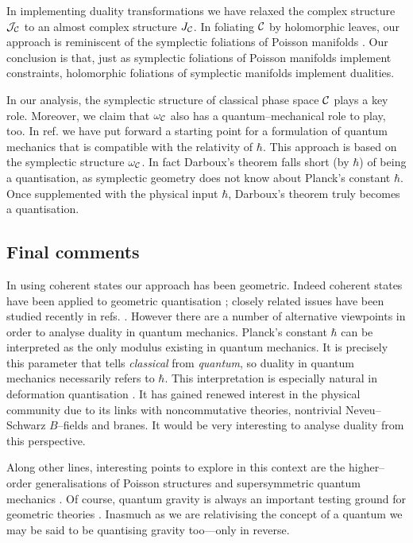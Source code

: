 \documentclass[a4paper,a4paper]{article}
\begin{document}
In implementing duality transformations we have relaxed the complex structure 
${\cal J}_{\cal C}$ to an almost complex structure $J_{\cal C}$. In foliating ${\cal C}$ 
by holomorphic leaves, our approach is reminiscent of the symplectic foliations 
of Poisson manifolds \cite{WEINSTEIN}. Our conclusion is that, just as symplectic 
foliations of Poisson manifolds implement constraints, holomorphic foliations of  
symplectic manifolds implement dualities. 

In our analysis, the symplectic structure of classical phase space ${\cal C}$ 
plays a key role. Moreover, we claim that $\omega_{\cal C}$ also has a quantum--mechanical 
role to play, too. In ref. \cite{STATEMENT} we have  put forward a starting point for a 
formulation of quantum mechanics that is compatible with the relativity of $\hbar$. 
This approach is based on the symplectic structure $\omega_{\cal C}$. In 
fact Darboux's theorem falls short (by $\hbar$) of being a quantisation, as
symplectic geometry does not know about Planck's constant $\hbar$. 
Once supplemented with the physical input $\hbar$, Darboux's theorem truly becomes 
a quantisation. 

\subsection{Final comments}\label{comm}

In using coherent states our approach has been geometric. 
Indeed coherent states have been applied to geometric quantisation 
\cite{GQCS}; closely related issues have been studied recently in 
refs. \cite{HALL, ZA, FUJII, TORONTO}.
However there are a number of alternative viewpoints in order
to analyse duality in quantum mechanics. Planck's constant $\hbar$ 
can be interpreted as the only modulus existing in quantum mechanics. 
It is precisely this parameter that tells {\it classical}\/ from {\it quantum}, 
so duality in quantum mechanics necessarily refers to $\hbar$.  
This interpretation is especially natural in deformation quantisation 
\cite{BEREZIN, SCHLICHENMAIER, GARCIA}. It has gained renewed interest 
in the physical community due to its links with noncommutative theories, 
nontrivial Neveu--Schwarz $B$--fields and branes. It would be very interesting 
to analyse duality from this perspective. 

Along other lines, interesting points to explore in this context are the 
higher--order generalisations of Poisson structures \cite{AZCA} and 
supersymmetric quantum mechanics \cite{RRAGA}. Of course, quantum gravity is 
always an important testing ground for geometric theories \cite{JANAN, THIEMANN, WAT, RAD}. 
Inasmuch as we are relativising the concept of a quantum we may be said
to be quantising gravity too---only in reverse.
\end{document}
